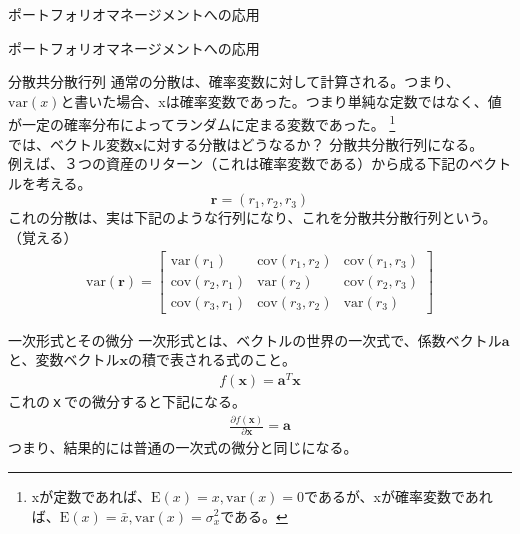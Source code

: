 \documentclass[dvipdfmx,autodetect-engine, unicode, 10pt, aspectratio=169]{beamer}
\begin{document}
\begin{frame}{ポートフォリオマネージメントへの応用}
    \begin{center}
        \Large ポートフォリオマネージメントへの応用    
    \end{center}
\end{frame}
\begin{frame}[fragile]{分散共分散行列}
    通常の分散は、確率変数に対して計算される。つまり、\\
    $\text{var}(x)$と書いた場合、xは確率変数であった。つまり単純な定数ではなく、値が一定の確率分布によってランダムに定まる変数であった。 
    \footnote{xが定数であれば、$\text{E}(x)=x, \text{var}(x)=0$であるが、xが確率変数であれば、$\text{E}(x)=\bar{x}, \text{var}(x)=\sigma^2_x$である。}
    \\
    では、ベクトル変数$\bm{x}$に対する分散はどうなるか？ 分散共分散行列になる。\\
    例えば、３つの資産のリターン（これは確率変数である）から成る下記のベクトルを考える。
    \[\bm{r} = (r_1, r_2, r_3)\]
    これの分散は、実は下記のような行列になり、これを分散共分散行列という。（覚える）
    \begin{align*}
        \text{var}(\bm{r}) = 
        \begin{bmatrix}
        \text{var}(r_1) & \text{cov}(r_1, r_2) & \text{cov}(r_1, r_3)\\
        \text{cov}(r_2, r_1) & \text{var}(r_2) & \text{cov}(r_2, r_3)\\
        \text{cov}(r_3, r_1) & \text{cov}(r_3, r_2) & \text{var}(r_3)
        \end{bmatrix}
    \end{align*}
    
\end{frame}

\begin{frame}{一次形式とその微分}
    一次形式とは、ベクトルの世界の一次式で、係数ベクトル$\bm{a}$と、変数ベクトル$\bm{x}$の積で表される式のこと。
    \begin{align*}
        f(\bm{x}) = \bm{a}^T\bm{x}
    \end{align*}
    これのｘでの微分すると下記になる。
    \begin{align*}
        \frac{\partial f(\bm{x})}{\partial \bm{x}} = \bm{a}
    \end{align*}
    つまり、結果的には普通の一次式の微分と同じになる。
\end{frame}
\end{document}
